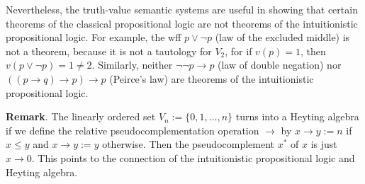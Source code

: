 \documentclass[12pt]{article}
\begin{document}
Nevertheless, the truth-value semantic systems are useful in showing that certain theorems of the classical propositional logic are not theorems of the intuitionistic propositional logic.  For example, the wff $p\vee \neg p$ (law of the excluded middle) is not a theorem, because it is not a tautology for $V_2$, for if $v(p)=1$, then $v(p\vee \neg p)=1 \ne 2$.  Similarly, neither $\neg \neg p \to p$ (law of double negation) nor $((p\to q)\to p ) \to p$ (Peirce's law) are theorems of the intuitionistic propositional logic.

\textbf{Remark}.  The linearly ordered set $V_n:=\lbrace 0,1,\ldots, n\rbrace$ turns into a Heyting algebra if we define the relative pseudocomplementation operation $\to$ by $x\to y:=n$ if $x\le y$ and $x\to y:=y$ otherwise.  Then the pseudocomplement $x^*$ of $x$ is just $x\to 0$.  This points to the connection of the intuitionistic propositional logic and Heyting algebra.

\end{document}
